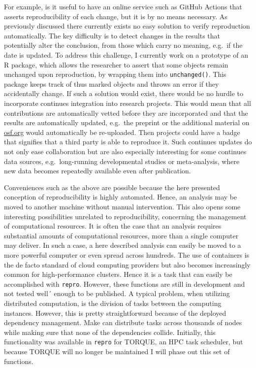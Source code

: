 \documentclass[12pt,a4paper,]{article}
\begin{document}
For example, is it useful to have an online service such as GitHub Actions that asserts reproducibility of each change, but it is by no means necessary.
As previously discussed there currently exists no easy solution to verify reproduction automatically.
The key difficulty is to detect changes in the results that potentially alter the conclusion, from those which carry no meaning, e.g.~if the date is updated.
To address this challenge, I currently work on a prototype of an R package, which allows the researcher to assert that some objects remain unchanged upon reproduction, by wrapping them into \texttt{unchanged()}.
This package keeps track of thus marked objects and throws an error if they accidentally change.
If such a solution would exist, there would be no hurdle to incorporate continues integration into research projects.
This would mean that all contributions are automatically vetted before they are incorporated and that the results are automatically updated, e.g.~the preprint or the additional material on \url{osf.org} would automatically be re-uploaded.
Then projects could have a badge that signifies that a third party is able to reproduce it.
Such continues updates do not only ease collaboration but are also especially interesting for some continues data sources, e.g.~long-running developmental studies or meta-analysis, where new data becomes repeatedly available even after publication.

Conveniences such as the above are possible because the here presented conception of reproducibility is highly automated.
Hence, an analysis may be moved to another machine without manual intervention.
This also opens some interesting possibilities unrelated to reproducibility, concerning the management of computational resources.
It is often the case that an analysis requires substantial amounts of computational resources, more than a single computer may deliver.
In such a case, a here described analysis can easily be moved to a more powerful computer or even spread across hundreds.
The use of containers is the de facto standard of cloud computing providers but also becomes increasingly common for high-performance clusters.
Hence it is a task that can easily be accomplished with \texttt{repro}.
However, these functions are still in development and not tested well´ enough to be published.
A typical problem, when utilizing distributed computation, is the division of tasks between the computing instances.
However, this is pretty straightforward because of the deployed dependency management.
Make can distribute tasks across thousands of nodes while making sure that none of the dependencies collide.
Initially, this functionality was available in \texttt{repro} for TORQUE, an HPC task scheduler, but because TORQUE will no longer be maintained I will phase out this set of functions.
\end{document}

